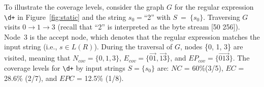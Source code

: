 



To illustrate the coverage levels, consider the graph $G$ for the regular expression \verb!\d+! in Figure~\ref{fig:static} and the string $s_0 = $``2'' with $S~=~\{s_0\}$. 
Traversing $G$ visits $0 \rightarrow 1 \rightarrow 3$ (recall that ``2'' is interpreted as the byte stream [50 256]). Node~$3$ is the accept node, which denotes that the regular expression matches the input string (i.e., $s \in L(R)$). 
During the traversal of $G$, nodes \{0, 1, 3\} are visited, meaning that $N_{cov} = \{0, 1, 3\}$, $E_{cov} = \{\overrightarrow{01}, \overrightarrow{13}\}$, and $EP_{cov} = \{\overrightarrow{013}\}$. 
The coverage levels for \verb!\d+! by input strings $S = \{s_0\}$ are: $NC$ = 60\%(3/5), $EC$ =  28.6\% (2/7), and $EPC$ =  12.5\% (1/8).%



